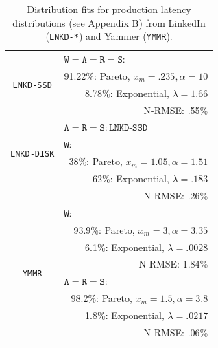 \documentclass{vldb}
\begin{document}
\begin{table}
\centering
\begin{tabular}{|c|r|}
\hline
\multirow{4}{*}{\texttt{LNKD-SSD}} & \multicolumn{1}{|l|}{$\texttt{W} = \texttt{A}= \texttt{R} = \texttt{S}:$} \\
& 91.22\%: Pareto, $x_m=.235, \alpha=10$\\
& 8.78\%: Exponential, $\lambda = 1.66$ \\
& N-RMSE: .55\%\\\hline
\multirow{4}{*}{\texttt{LNKD-DISK}} & \multicolumn{1}{|l|}{$\texttt{A}= \texttt{R} = \texttt{S}: \texttt{LNKD-SSD}$}\\\cline{2-2}
& \multicolumn{1}{|l|}{\texttt{W}:}\\
& 38\%: Pareto, $x_m=1.05, \alpha=1.51$\\
& \hfill 62\%: Exponential, $\lambda = .183$ \\
& N-RMSE: .26\%\\
\hline
\multirow{8}{*}{\texttt{YMMR}} & \multicolumn{1}{|l|}{\texttt{W}:} \\
& 93.9\%: Pareto, $x_m=3, \alpha=3.35$\\
& 6.1\%: Exponential, $\lambda = .0028$ \\
& N-RMSE: 1.84\%\\\cline{2-2}
& \multicolumn{1}{|l|}{$\texttt{A}= \texttt{R} = \texttt{S}:$}\\
& 98.2\%: Pareto, $x_m=1.5, \alpha=3.8$\\
& 1.8\%: Exponential, $\lambda=.0217$\\
& N-RMSE: .06\%\\
\hline
\end{tabular}
\vspace{-6pt}
\caption{Distribution fits for production latency distributions (see Appendix B) from LinkedIn (\texttt{LNKD-*}) and Yammer (\texttt{YMMR}).}
\vspace{-12pt}
\label{table:fits}
\end{table}
\end{document}
